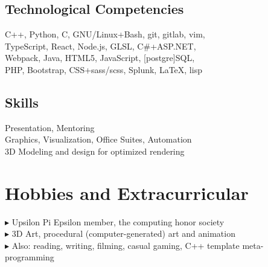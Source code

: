 \documentclass[Letterpaper,11pt]{article}
\newcommand{\bul}{$\blacktriangleright$ }
\begin{document}
\begin{multicols}{2}

    \subsection*{Technological Competencies}

        C++, Python, C, GNU/Linux+Bash, git, gitlab, vim, \\
        TypeScript, React, Node.js, GLSL, C\#+ASP.NET, \\
        Webpack, Java, HTML5, JavaScript, [postgre]SQL, \\ 
        PHP, Bootstrap, CSS+sass/scss, Splunk, \LaTeX, lisp \\

    \subsection*{Skills}

        Presentation, Mentoring\\
        Graphics, Visualization, Office Suites, Automation\\
        3D Modeling and design for optimized rendering

\end{multicols}

\section*{Hobbies and Extracurricular}

    \bul Upsilon Pi Epsilon member, the computing honor society\\
    \bul 3D Art, procedural (computer-generated) art and animation\\
    \bul Also: reading, writing, filming, casual gaming, C++ template meta-programming

\clearpage
\end{document}
